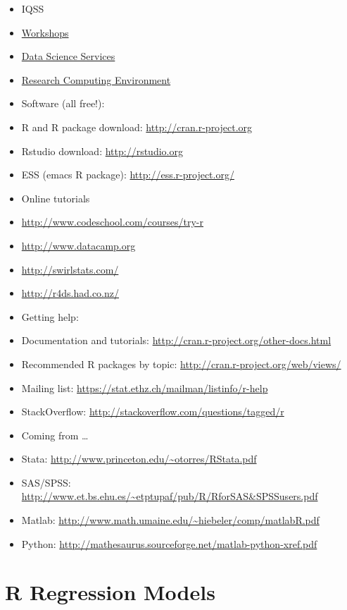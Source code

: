 \documentclass[]{book}
\begin{document}
\begin{itemize}
\item
  IQSS
\item
  \href{https://dss.iq.harvard.edu/workshop-materials}{Workshops}
\item
  \href{https://dss.iq.harvard.edu/}{Data Science Services}
\item
  \href{https://iqss.github.io/dss-rce/}{Research Computing Environment}
\item
  Software (all free!):
\item
  R and R package download: \url{http://cran.r-project.org}
\item
  Rstudio download: \url{http://rstudio.org}
\item
  ESS (emacs R package): \url{http://ess.r-project.org/}
\item
  Online tutorials
\item
  \url{http://www.codeschool.com/courses/try-r}
\item
  \url{http://www.datacamp.org}
\item
  \url{http://swirlstats.com/}
\item
  \url{http://r4ds.had.co.nz/}
\item
  Getting help:
\item
  Documentation and tutorials:
  \url{http://cran.r-project.org/other-docs.html}
\item
  Recommended R packages by topic:
  \url{http://cran.r-project.org/web/views/}
\item
  Mailing list: \url{https://stat.ethz.ch/mailman/listinfo/r-help}
\item
  StackOverflow: \url{http://stackoverflow.com/questions/tagged/r}
\item
  Coming from \ldots{}
\item
  Stata: \url{http://www.princeton.edu/~otorres/RStata.pdf}
\item
  SAS/SPSS:
  \url{http://www.et.bs.ehu.es/~etptupaf/pub/R/RforSAS\&SPSSusers.pdf}
\item
  Matlab: \url{http://www.math.umaine.edu/~hiebeler/comp/matlabR.pdf}
\item
  Python:
  \url{http://mathesaurus.sourceforge.net/matlab-python-xref.pdf}
\end{itemize}

\chapter{R Regression Models}\label{r-regression-models}
\end{document}
